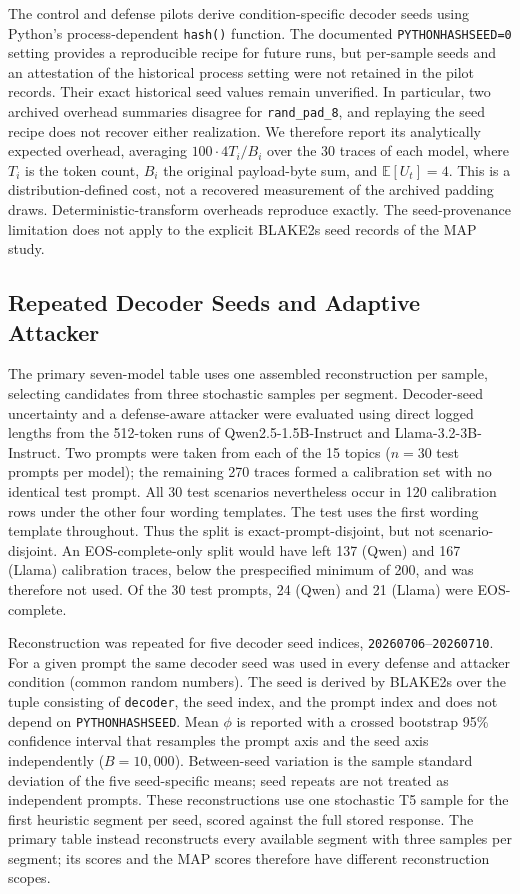 \documentclass[electronics,article,submit,pdftex,moreauthors]{Definitions/mdpi}
\begin{document}
The control and defense pilots derive condition-specific decoder seeds using Python's process-dependent \texttt{hash()} function. The documented \texttt{PYTHONHASHSEED=0} setting provides a reproducible recipe for future runs, but per-sample seeds and an attestation of the historical process setting were not retained in the pilot records. Their exact historical seed values remain unverified. In particular, two archived overhead summaries disagree for \texttt{rand\_pad\_8}, and replaying the seed recipe does not recover either realization. We therefore report its analytically expected overhead, averaging $100\cdot4T_i/B_i$ over the 30 traces of each model, where $T_i$ is the token count, $B_i$ the original payload-byte sum, and $\mathbb{E}[U_t]=4$. This is a distribution-defined cost, not a recovered measurement of the archived padding draws. Deterministic-transform overheads reproduce exactly. The seed-provenance limitation does not apply to the explicit BLAKE2s seed records of the MAP study.

\subsection{Repeated Decoder Seeds and Adaptive Attacker}\label{sec:robustness-methods}
The primary seven-model table uses one assembled reconstruction per sample, selecting candidates from three stochastic samples per segment. Decoder-seed uncertainty and a defense-aware attacker were evaluated using direct logged lengths from the 512-token runs of Qwen2.5-1.5B-Instruct and Llama-3.2-3B-Instruct. Two prompts were taken from each of the 15 topics ($n=30$ test prompts per model); the remaining 270 traces formed a calibration set with no identical test prompt. All 30 test scenarios nevertheless occur in 120 calibration rows under the other four wording templates. The test uses the first wording template throughout. Thus the split is exact-prompt-disjoint, but not scenario-disjoint. An EOS-complete-only split would have left 137 (Qwen) and 167 (Llama) calibration traces, below the prespecified minimum of 200, and was therefore not used. Of the 30 test prompts, 24 (Qwen) and 21 (Llama) were EOS-complete.

Reconstruction was repeated for five decoder seed indices, \texttt{20260706}--\texttt{20260710}. For a given prompt the same decoder seed was used in every defense and attacker condition (common random numbers). The seed is derived by BLAKE2s over the tuple consisting of \texttt{decoder}, the seed index, and the prompt index and does not depend on \texttt{PYTHONHASHSEED}. Mean $\phi$ is reported with a crossed bootstrap 95\% confidence interval that resamples the prompt axis and the seed axis independently ($B=10{,}000$). Between-seed variation is the sample standard deviation of the five seed-specific means; seed repeats are not treated as independent prompts. These reconstructions use one stochastic T5 sample for the first heuristic segment per seed, scored against the full stored response. The primary table instead reconstructs every available segment with three samples per segment; its scores and the MAP scores therefore have different reconstruction scopes.
\end{document}
